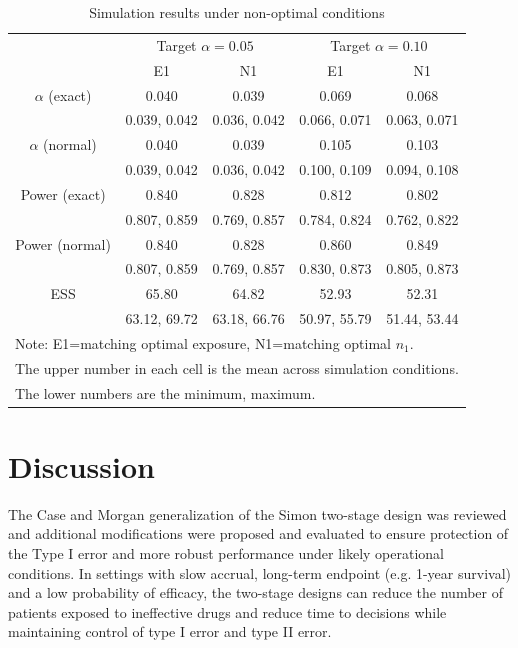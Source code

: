 \documentclass[12pt]{article}
\begin{document}
\begin{table}[h]
\caption{Simulation results under non-optimal conditions}
\label{noptcond}
 \begin{center}
 \begin{tabular}{c|cc|cc}\hline\hline
\vspace{-8pt}&\multicolumn{2}{c}{Target $\alpha=0.05$}\vrule&
\multicolumn{2}{c}{Target $\alpha=0.10$}\\
&E1&N1&E1&N1\\
\hline
$\alpha$ (exact)&0.040&0.039&0.069&0.068\\
&0.039, 0.042&0.036, 0.042&0.066, 0.071&0.063, 0.071\\
\hline
$\alpha$ (normal)&0.040&0.039&0.105&0.103\\
&0.039, 0.042&0.036, 0.042&0.100, 0.109&0.094, 0.108\\
\hline
Power (exact)&0.840&0.828&0.812&0.802\\
&0.807, 0.859&0.769, 0.857&0.784, 0.824&0.762, 0.822\\
\hline
Power (normal)&0.840&0.828&0.860&0.849\\
&0.807, 0.859&0.769, 0.857&0.830, 0.873&0.805, 0.873\\
\hline
ESS&65.80&64.82&52.93&52.31\\
&63.12, 69.72&63.18, 66.76& 50.97, 55.79&51.44, 53.44\\
\hline\hline
\multicolumn{5}{l}{\vspace{-8pt}Note:  E1=matching optimal exposure, N1=matching optimal $n_1$.}\\
\multicolumn{5}{l}{       \vspace{-8pt}The upper number in each cell is the mean across simulation conditions.}\\
\multicolumn{5}{l}{       The lower numbers are the minimum, maximum.}
\end{tabular}
\end{center}
\end{table}

\clearpage


\section{Discussion}

The Case and Morgan generalization of the Simon two-stage design was reviewed and additional
modifications were proposed and evaluated to ensure protection of the Type I error and more robust
performance under likely operational conditions. In settings with slow accrual, long-term endpoint
(e.g. 1-year survival) and a low probability of efficacy, the two-stage designs can reduce the
number of patients exposed to ineffective drugs and reduce time to decisions while maintaining
control of type I error and type II error.
\end{document}
